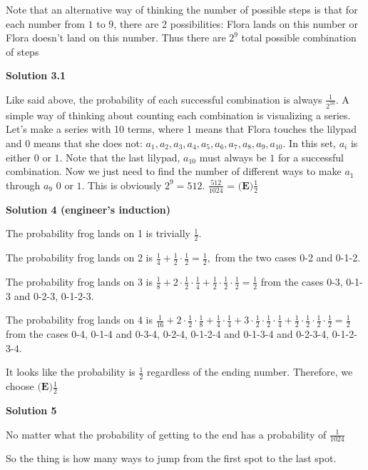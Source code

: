 \begin{enumerate}
 Note that an alternative way of thinking the number of possible steps is that for each number from $1$ to $9$, there are 2 possibilities: Flora lands on this number or Flora doesn't land on this number. Thus there are $2^9$ total possible combination of steps

 



\textbf{Solution 3.1}

Like said above, the probability of each successful combination is always $\frac{1}{2^{10}}$. A simple way of thinking about counting each combination is visualizing a series. Let's make a series with 10 terms, where 1 means that Flora touches the lilypad and 0 means that she does not: $a_1, a_2, a_3, a_4, a_5, a_6, a_7, a_8, a_9, a_{10}$. In this set, $a_i$ is either $0$ or $1$. Note that the last lilypad, $a_{10}$ must always be $1$ for a successful combination. Now we just need to find the number of different ways to make $a_1$ through $a_9$ $0$ or $1$. This is obviously $2^{9} = 512$. $\frac{512}{1024}$ = $\boxed{\textbf{(E)} \frac{1}{2}}$




\textbf{Solution 4 (engineer's induction)}

The probability frog lands on 1 is trivially $\frac{1}{2}.$

 The probability frog lands on 2 is $\frac{1}{4} + \frac{1}{2}\cdot \frac{1}{2} = \frac{1}{2},$ from the two cases 0-2 and 0-1-2.

 The probability frog lands on 3 is $\frac{1}{8} + 2\cdot \frac{1}{2} \cdot \frac{1}{4} + \frac{1}{2}\cdot \frac{1}{2}\cdot \frac{1}{2} = \frac{1}{2}$ from the cases 0-3, 0-1-3 and 0-2-3, 0-1-2-3.

 The probability frog lands on 4 is $\frac{1}{16} + 2\cdot \frac{1}{2} \cdot \frac{1}{8} + \frac{1}{4}\cdot \frac{1}{4} + 3\cdot \frac{1}{2}\cdot \frac{1}{2}\cdot \frac{1}{4} + \frac{1}{2} \cdot \frac{1}{2} \cdot \frac{1}{2} \cdot \frac{1}{2} = \frac{1}{2}$ from the cases 0-4, 0-1-4 and 0-3-4, 0-2-4, 0-1-2-4 and 0-1-3-4 and 0-2-3-4, 0-1-2-3-4.

 It looks like the probability is $\frac{1}{2}$ regardless of the ending number. Therefore, we choose $\boxed{\textbf{(E)} \frac{1}{2}}$




\textbf{Solution 5}

No matter what the probability of getting to the end has a probability of $\frac{1}{1024}$

 So the thing is how many ways to jump from the first spot to the last spot.


\end{enumerate}
